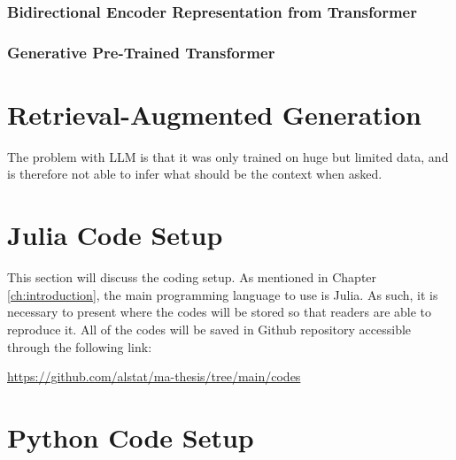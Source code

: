 \subsubsection{Bidirectional Encoder Representation from Transformer}
\subsubsection{Generative Pre-Trained Transformer}
\section{Retrieval-Augmented Generation}
The problem with LLM is that it was only trained on huge but limited data, and is therefore not able to infer what should be the context when asked.
\section{Julia Code Setup}\label{sec:code_setup}
This section will discuss the coding setup. As mentioned in Chapter \ref{ch:introduction}, the main programming language to use is Julia. As such, it is necessary to present where the codes will be stored so that readers are able to reproduce it. All of the codes will be saved in Github repository accessible through the following link:
\begin{center}
    \url{https://github.com/alstat/ma-thesis/tree/main/codes}
\end{center}
\section{Python Code Setup}\label{sec:py_code_setup}
